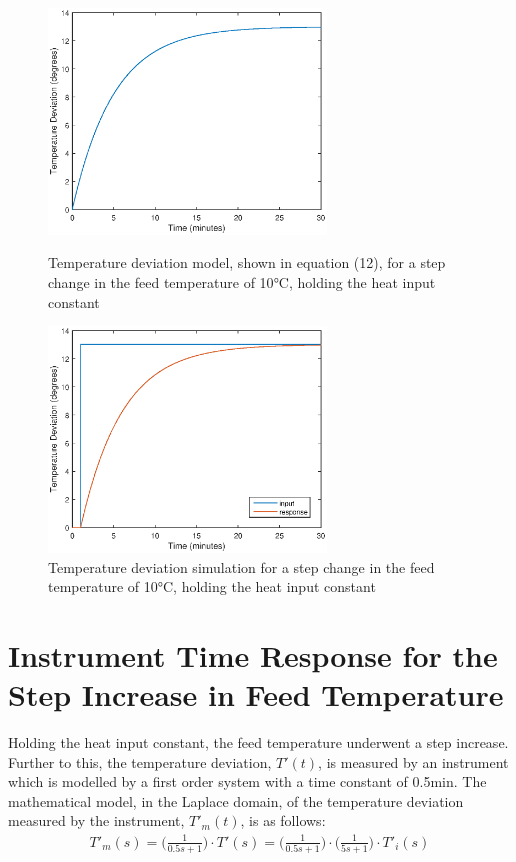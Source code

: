 \documentclass{article}
\begin{document}
\begin{figure}[h]
\begin{minipage}{0.45\textwidth}
\centering
\includegraphics[height=6cm]{1c_mod}
\caption{Temperature deviation model, shown in equation (12), for a step change in the feed temperature of 10$\si{\degreeCelsius}$, holding the heat input constant}
\end{minipage}
\hspace{1cm}
\begin{minipage}{0.45\textwidth}
\centering
\includegraphics[height=6cm]{1c_sim}
\caption{Temperature deviation simulation for a step change in the feed temperature of 10$\si{\degreeCelsius}$, holding the heat input constant}
\end{minipage}
\end{figure}



\section{Instrument Time Response for the Step Increase in Feed Temperature}

Holding the heat input constant, the feed temperature underwent a step increase. Further to this, the temperature deviation, $T'(t)$, is measured by an instrument which is modelled by a first order system with a time constant of 0.5$\si{\minute}$. The mathematical model, in the Laplace domain, of the temperature deviation measured by the instrument, $T'_m(t)$, is as follows: 
\begin{align*}
T'_m(s) = \bigg(\frac{1}{0.5 s + 1}\bigg) \cdot T'(s) = \bigg(\frac{1}{0.5s + 1}\bigg) \cdot \bigg(\frac{1}{5s + 1}\bigg) \cdot T'_i(s)
\end{align*}
\end{document}
